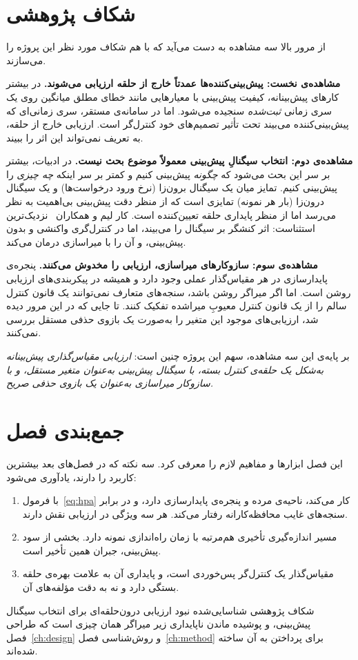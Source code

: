 \section{شکاف پژوهشی}
\label{sec:bg-gap}

از مرور بالا سه مشاهده به دست می‌آید که با هم شکاف مورد نظر این پروژه را می‌سازند.

\textbf{مشاهده‌ی نخست: پیش‌بینی‌کننده‌ها عمدتاً خارج از حلقه ارزیابی می‌شوند.} در بیشتر
کارهای پیش‌بینانه، کیفیت پیش‌بینی با معیارهایی مانند خطای مطلق میانگین روی یک سری زمانی
\emph{ثبت‌شده} سنجیده می‌شود. اما در سامانه‌ی مستقر، سری زمانی‌ای که پیش‌بینی‌کننده می‌بیند
تحت تأثیر تصمیم‌های خود کنترل‌گر است. ارزیابی خارج از حلقه، به تعریف نمی‌تواند این اثر را
ببیند.

\textbf{مشاهده‌ی دوم: انتخاب سیگنالِ پیش‌بینی معمولاً موضوع بحث نیست.} در ادبیات، بیشتر بر سر
این بحث می‌شود که \emph{چگونه} پیش‌بینی کنیم و کمتر بر سر اینکه \emph{چه چیزی} را پیش‌بینی
کنیم. تمایز میان یک سیگنال برون‌زا (نرخ ورود درخواست‌ها) و یک سیگنال درون‌زا (بار هر نمونه)
تمایزی است که از منظر دقت پیش‌بینی بی‌اهمیت به نظر می‌رسد اما از منظر پایداری حلقه
تعیین‌کننده است. کار لیم و همکاران~\cite{lim2009} نزدیک‌ترین استثناست: اثر کنشگر بر سیگنال را
می‌بیند، اما در کنترل‌گری واکنشی و بدون پیش‌بینی، و آن را با میراسازی درمان می‌کند.

\textbf{مشاهده‌ی سوم: سازوکارهای میراسازی، ارزیابی را مخدوش می‌کنند.} پنجره‌ی پایدارسازی در
هر مقیاس‌گذار عملی وجود دارد و همیشه در پیکربندی‌های ارزیابی روشن است. اما اگر میراگر روشن
باشد، سنجه‌های متعارف نمی‌توانند یک قانون کنترل سالم را از یک قانون کنترل معیوبِ میراشده
تفکیک کنند. تا جایی که در این مرور دیده شد، ارزیابی‌های موجود این متغیر را به‌صورت یک بازوی
حذفی مستقل بررسی نمی‌کنند.

بر پایه‌ی این سه مشاهده، سهم این پروژه چنین است: \emph{ارزیابی مقیاس‌گذاری پیش‌بینانه به‌شکل
یک حلقه‌ی کنترل بسته، با سیگنال پیش‌بینی به‌عنوان متغیر مستقل، و با سازوکار میراسازی به‌عنوان
یک بازوی حذفی صریح.}

\section{جمع‌بندی فصل}
\label{sec:bg-summary}

این فصل ابزارها و مفاهیم لازم را معرفی کرد. سه نکته که در فصل‌های بعد بیشترین کاربرد را
دارند، یادآوری می‌شود:

\begin{enumerate}
  \item {} با فرمول~\ref{eq:hpa} کار می‌کند، ناحیه‌ی مرده و پنجره‌ی پایدارسازی دارد،
  و در برابر سنجه‌های غایب محافظه‌کارانه رفتار می‌کند. هر سه ویژگی در ارزیابی نقش دارند.
  \item مسیر اندازه‌گیری تأخیری هم‌مرتبه با زمان راه‌اندازی نمونه دارد. بخشی از سود پیش‌بینی،
  جبران همین تأخیر است.
  \item مقیاس‌گذار یک کنترل‌گر پس‌خوردی است، و پایداری آن به علامت بهره‌ی حلقه بستگی دارد و نه
  به دقت مؤلفه‌های آن.
\end{enumerate}

شکاف پژوهشی شناسایی‌شده \mdash{} نبود ارزیابی درون‌حلقه‌ای برای انتخاب سیگنال پیش‌بینی، و پوشیده
ماندن ناپایداری زیر میراگر \mdash{} همان چیزی است که طراحی فصل~\ref{ch:design} و روش‌شناسی
فصل~\ref{ch:method} برای پرداختن به آن ساخته شده‌اند.
